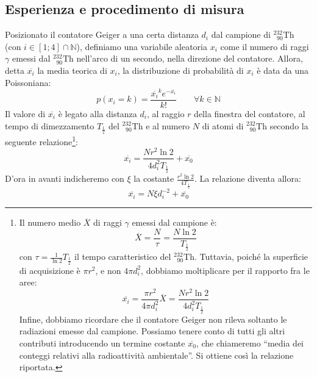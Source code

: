 \documentclass{article}
\newcommand*{\Th}{^{232}_{\;\;90} \text{Th}}
\begin{document}
\subsection{Esperienza e procedimento di misura}

Posizionato il contatore Geiger a una certa distanza $d_i$ dal campione di $\Th$
(con $i\in\left[1;4\right]\cap\mathbb{N}$),
definiamo una variabile aleatoria $x_i$ come il numero di raggi $\gamma$
emessi dal $\Th$ nell'arco di un secondo, nella direzione del contatore.
Allora, detta $\overline{x_i}$ la media teorica
di $x_i$, la distribuzione di probabilità di $x_i$ è data da una Poissoniana:
\[
    p(x_i=k)=\frac{\overline{x_i}^k e^{-\overline{x_i}}}{k!}
    \qquad
    \forall k\in\mathbb{N}
\]
Il valore di $\overline{x_i}$ è legato alla distanza $d_i$, al raggio $r$
della finestra del contatore, al tempo di dimezzamento $T_\frac{1}{2}$ del
$\Th$ e al numero $N$ di atomi di $\Th$ secondo la seguente relazione\footnote{
    Il numero medio $\overline{X}$ di raggi $\gamma$ emessi dal campione è:
    \[
        \overline{X} = \frac{N}{\tau} = \frac{N\ln{2}}{T_\frac{1}{2}}
    \]
    con $\tau=\frac{1}{\ln{2}}T_\frac{1}{2}$ il tempo caratteristico del $\Th$.
    Tuttavia, poiché la superficie di acquisizione è $\pi r^2$, e non $4\pi d_i^2$,
    dobbiamo moltiplicare per il rapporto fra le aree:
    \[
        \overline{x_i} = \frac{\pi r^2}{4\pi d_i^2} \overline{X} =
        \frac{Nr^2\ln{2}}{4 d_i^2 T_\frac{1}{2}}
    \]
    Infine, dobbiamo ricordare che il contatore Geiger non rileva soltanto le
    radiazioni emesse dal campione. Possiamo tenere conto di tutti gli altri
    contributi introducendo un termine costante $\overline{x_0}$, che chiameremo
    “media dei conteggi relativi alla radioattività ambientale”.
    Si ottiene così la relazione riportata.
}:
\[
    \overline{x_i} = \frac{Nr^2\ln{2}}{4 d_i^2 T_\frac{1}{2}} + \overline{x_0}
\]
D'ora in avanti indicheremo con $\xi$ la costante $\frac{r^2\ln{2}}{4T_\frac{1}{2}}$.
La relazione diventa allora:
\[\overline{x_i} = N\xi d_i^{-2} + \overline{x_0}\]
\end{document}
